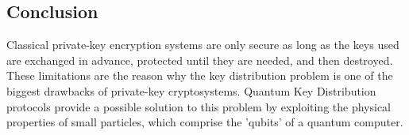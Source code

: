\documentclass[conference]{IEEEtran}
\begin{document}
\begin{enumerate}
%



\section{Conclusion}
Classical private-key encryption systems are only secure as long as the keys used are exchanged in advance, protected until they are needed, and then destroyed. These limitations are the reason why the key distribution problem is one of the biggest drawbacks of private-key cryptosystems. Quantum Key Distribution protocols provide a possible solution to this problem by exploiting the physical properties of small particles, which comprise the 'qubits' of a quantum computer.\\


\end{enumerate}
\end{document}
